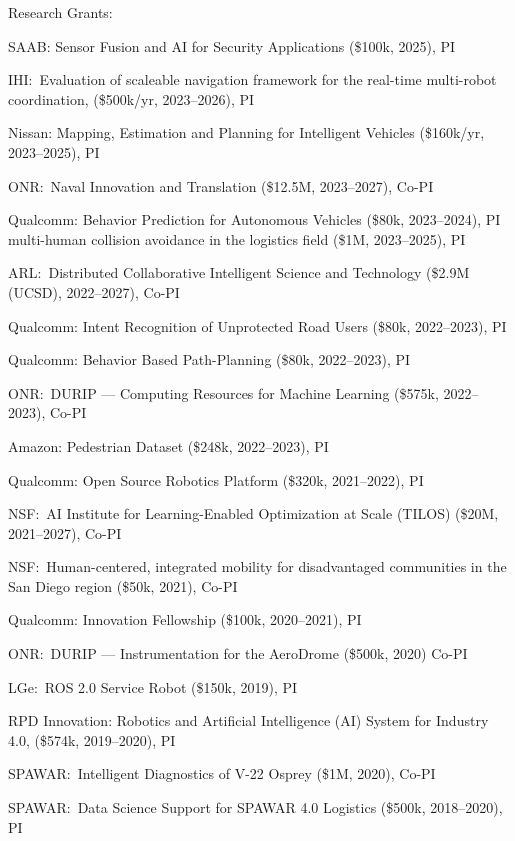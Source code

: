 \documentclass{article}
\begin{document}
\begin{cv}
	\begin{cvlist}{Research Grants:}
		\item SAAB: Sensor Fusion and AI for Security Applications (\$100k, 2025), PI
		\item IHI:\ Evaluation of scaleable navigation framework for the real-time
		multi-robot coordination, (\$500k/yr, 2023--2026), PI
		\item Nissan: Mapping, Estimation and Planning for Intelligent Vehicles
		(\$160k/yr, 2023--2025), PI
		\item ONR:\ Naval Innovation and Translation (\$12.5M, 2023--2027), Co-PI
		\item Qualcomm: Behavior Prediction for Autonomous Vehicles (\$80k, 2023--2024), PI
		multi-human collision avoidance in the logistics field (\$1M, 2023--2025), PI
		\item ARL:\ Distributed Collaborative Intelligent Science and Technology (\$2.9M
		(UCSD), 2022--2027), Co-PI
		\item Qualcomm: Intent Recognition of Unprotected Road Users (\$80k, 2022--2023),
		PI
		\item Qualcomm: Behavior Based Path-Planning (\$80k, 2022--2023), PI
		\item ONR:\ DURIP --- Computing Resources for Machine Learning (\$575k, 2022--2023),
		Co-PI
		\item Amazon: Pedestrian Dataset (\$248k, 2022--2023), PI
		\item Qualcomm: Open Source Robotics Platform (\$320k, 2021--2022), PI
		\item NSF:\ AI Institute for Learning-Enabled Optimization at Scale
		(TILOS) (\$20M, 2021--2027), Co-PI
		\item NSF:\ Human-centered, integrated mobility for disadvantaged
		communities in the San Diego region (\$50k, 2021), Co-PI
		\item Qualcomm: Innovation Fellowship (\$100k, 2020--2021), PI
		\item ONR:\ DURIP --- Instrumentation for the AeroDrome (\$500k, 2020) Co-PI
		\item LGe:\ ROS 2.0 Service Robot (\$150k, 2019), PI
		\item RPD Innovation: Robotics and Artificial Intelligence (AI) System for
		Industry 4.0, (\$574k, 2019--2020), PI
		\item SPAWAR:\ Intelligent Diagnostics of V-22 Osprey (\$1M, 2020), Co-PI
		\item SPAWAR:\ Data Science Support for SPAWAR 4.0 Logistics (\$500k,
		2018--2020), PI

\end{cvlist}
\end{cv}
\end{document}
